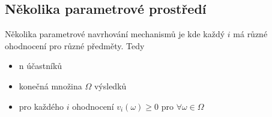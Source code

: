 \subsection{Několika parametrové prostředí}
\begin{definition}
    \label{def:multi_param}
    Několika parametrové navrhování mechanismů je kde každý $i$ má různé ohodnocení pro různé předměty. 
    Tedy 
    \begin{itemize}
        \item n účastníků
        \item konečná množina $\Omega$ výsledků
        \item pro každého $i$ ohodnocení $v_i(\omega) \geq 0$ pro $\forall \omega \in \Omega$
    \end{itemize}
\end{definition}

